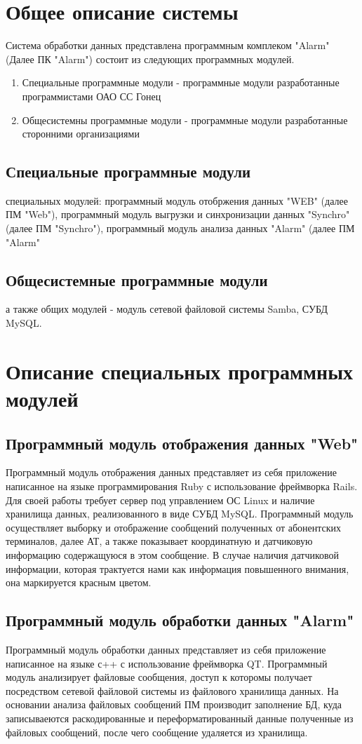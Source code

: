 \documentclass[12pt]{article}[a4paper,14pt,russian]
\begin{document}
	\section{Общее описание системы}
	Система обработки данных представлена программным комплеком "Alarm" (Далее ПК "Alarm") состоит из следующих программных модулей.
	\begin{enumerate}
	\item  Специальные программные модули - программные модули разработанные программистами ОАО СС Гонец
	\item  Общесистемны программные модули  - программные модули разработанные сторонними организациями
	\end{enumerate}
    \subsection {Специальные программные модули}
	специальных модулей: программный модуль отобржения данных "WEB" (далее ПМ "Web"), программный модуль выгрузки и синхронизации данных "Synchro" (далее ПМ "Synchro"), программный модуль анализа данных "Alarm" (далее ПМ "Alarm" 
	\subsection {Общесистемные программные модули}
	а также общих модулей - модуль сетевой файловой системы Samba, СУБД MySQL.

	\section{Описание специальных программных модулей}	
	\subsection{Программный модуль отображения данных "Web"}

	Программный модуль отображения данных представляет из себя приложение написанное
	на языке программирования Ruby с использование фреймворка Rails. Для своей работы требует сервер под управлением ОС Linux и наличие хранилища данных, реализованного в виде СУБД MySQL. Программный модуль осуществляет выборку и отображение сообщений полученных от абонентских терминалов, далее АТ, а также показывает координатную и датчиковую информацию содержащуюся в этом сообщение. В случае наличия датчиковой информации, которая трактуется нами как информация повышенного внимания, она маркируется красным цветом.
	
	\subsection{Программный модуль обработки данных "Alarm"}
	Программный модуль обработки данных представляет из себя приложение написанное на
	языке с++ с использование фреймворка QT. Программный модуль анализирует файловые сообщения, доступ к которомы получает посредством сетевой файловой системы из файлового хранилища данных. На основании анализа файловых сообщений ПМ производит заполнение БД, куда записываеются раскодированные и переформатированный данные полученные из файловых сообщений, после чего сообщение удаляется из хранилища. 
\end{document}
